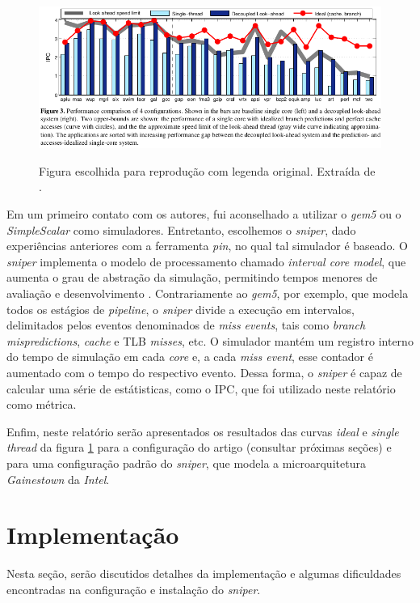 \documentclass[12pt]{article}
\begin{document}
\begin{figure}[h!]
  \centering
  \includegraphics[width=\textwidth]{img/fig3}%
  \label{fig:artigo}%
  \caption{Figura escolhida para reprodução com legenda original. Extraída de
  \cite{artigo}.}
\end{figure}

Em um primeiro contato com os autores, fui aconselhado a utilizar o
\textit{gem5} ou o \textit{SimpleScalar} como simuladores. Entretanto,
escolhemos o \textit{sniper}, dado experiências anteriores com
a ferramenta \textit{pin}, no qual tal simulador é baseado. O \textit{sniper}
implementa o modelo de processamento chamado \textit{interval core model}, que
aumenta o grau de abstração da simulação, permitindo tempos menores de avaliação
e desenvolvimento \cite{sniper}. Contrariamente ao \textit{gem5}, por exemplo, que
modela todos os estágios de \textit{pipeline}, o \textit{sniper} divide a
execução em intervalos, delimitados pelos eventos denominados de \textit{miss
events}, tais como \textit{branch mispredictions}, \textit{cache} e TLB
\textit{misses}, etc. O simulador mantém um registro interno do tempo de
simulação em cada \textit{core} e, a cada \textit{miss event}, esse contador é
aumentado com o tempo do respectivo evento. Dessa forma, o \textit{sniper} é
capaz de calcular uma série de estátisticas, como o IPC, que foi utilizado
neste relatório como métrica.

Enfim, neste relatório serão apresentados os resultados das curvas
\textit{ideal} e \textit{single thread} da figura \ref{fig:artigo} para a
configuração do artigo (consultar próximas seções) e para uma configuração
padrão do \textit{sniper}, que modela a microarquitetura \textit{Gainestown} da
\textit{Intel}.

\section {Implementação}

Nesta seção, serão discutidos detalhes da implementação e algumas dificuldades
encontradas na configuração e instalação do \textit{sniper}.
\end{document}
